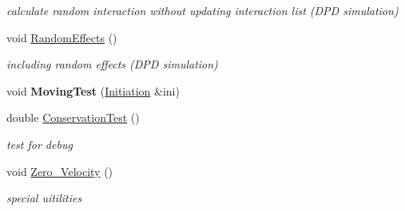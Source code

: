 \begin{CompactItemize}
\begin{CompactList}\small\item\em calculate random interaction without updating interaction list (DPD simulation) \item\end{CompactList}\item 
void \hyperlink{classHydrodynamics_8f826d2003ca7a4782b028b761a26421}{RandomEffects} ()
\begin{CompactList}\small\item\em including random effects (DPD simulation) \item\end{CompactList}\item 
\hypertarget{classHydrodynamics_a737dcae7a8b53a7829da52a6eee593d}{
void \textbf{MovingTest} (\hyperlink{classInitiation}{Initiation} \&ini)}
\label{classHydrodynamics_a737dcae7a8b53a7829da52a6eee593d}

\item 
\hypertarget{classHydrodynamics_1baf3a0ed4c17a3758b50c223b321f8a}{
double \hyperlink{classHydrodynamics_1baf3a0ed4c17a3758b50c223b321f8a}{ConservationTest} ()}
\label{classHydrodynamics_1baf3a0ed4c17a3758b50c223b321f8a}

\begin{CompactList}\small\item\em test for debug \item\end{CompactList}\item 
void \hyperlink{classHydrodynamics_4f65196eb3002238371d0e04dd76c02a}{Zero\_\-Velocity} ()
\begin{CompactList}\small\item\em special uitilities \item\end{CompactList}\end{CompactItemize}

